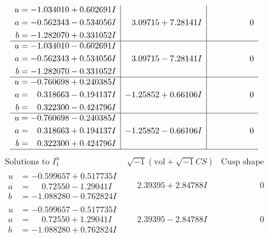 \documentclass[1p]{elsarticle_modified}
\theoremstyle{definition}
\newcommand{\I}{\sqrt{-1}}
\begin{document}
$$\begin{array}{c|c|c}
\begin{aligned}
u &= -1.034010 + 0.602691 I \\
a &= -0.562343 - 0.534056 I \\
b &= -1.282070 + 0.331052 I\end{aligned}
 & \phantom{-}3.09715 + 7.28141 I & \phantom{-0.000000 } 0 \\ \hline\begin{aligned}
u &= -1.034010 - 0.602691 I \\
a &= -0.562343 + 0.534056 I \\
b &= -1.282070 - 0.331052 I\end{aligned}
 & \phantom{-}3.09715 - 7.28141 I & \phantom{-0.000000 } 0 \\ \hline\begin{aligned}
u &= -0.760698 + 0.240385 I \\
a &= \phantom{-}0.318663 - 0.194137 I \\
b &= \phantom{-}0.322300 - 0.424796 I\end{aligned}
 & -1.25852 + 0.66106 I & \phantom{-0.000000 } 0 \\ \hline\begin{aligned}
u &= -0.760698 - 0.240385 I \\
a &= \phantom{-}0.318663 + 0.194137 I \\
b &= \phantom{-}0.322300 + 0.424796 I\end{aligned}
 & -1.25852 - 0.66106 I & \phantom{-0.000000 } 0\\
 \hline 
 \end{array}$$\newpage$$\begin{array}{c|c|c}  
\text{Solutions to }I^u_{1}& \I (\text{vol} + \sqrt{-1}CS) & \text{Cusp shape}\\
 \hline 
\begin{aligned}
u &= -0.599657 + 0.517735 I \\
a &= \phantom{-}0.72550 - 1.29041 I \\
b &= -1.088280 - 0.762824 I\end{aligned}
 & \phantom{-}2.39395 + 2.84788 I & \phantom{-0.000000 } 0 \\ \hline\begin{aligned}
u &= -0.599657 - 0.517735 I \\
a &= \phantom{-}0.72550 + 1.29041 I \\
b &= -1.088280 + 0.762824 I\end{aligned}
 & \phantom{-}2.39395 - 2.84788 I & \phantom{-0.000000 } 0 \\ \hline\begin{aligned}

\end{aligned}
\end{array}$$
\end{document}
